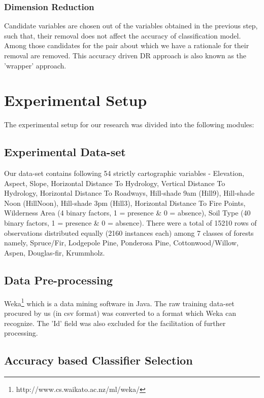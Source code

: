 \documentclass{llncs}
\begin{document}
\subsubsection{Dimension Reduction}

Candidate variables are chosen out of the variables obtained in the previous step, such that, their removal does not affect the accuracy of classification model. Among those candidates for the pair about which we have a rationale for their removal are removed. This accuracy driven DR approach is also known as the ’wrapper’ approach.


\section{Experimental Setup}

The experimental setup for our research was divided into the following modules:

\subsection{Experimental Data-set}

Our data-set contains following 54 strictly cartographic variables - Elevation, Aspect, Slope, Horizontal Distance To Hydrology, Vertical Distance To Hydrology, Horizontal Distance To Roadways, Hill-shade 9am (Hill9), Hill-shade Noon (HillNoon), Hill-shade 3pm (Hill3), Horizontal Distance To Fire Points, Wilderness Area (4 binary factors, 1 = presence \& 0 = absence), Soil Type (40 binary factors, 1 = presence \& 0 = absence). There were a total of 15210 rows of observations distributed equally (2160 instances each) among 7 classes of forests namely, Spruce/Fir, Lodgepole Pine, Ponderosa Pine, Cottonwood/Willow, Aspen, Douglas-fir, Krummholz.


\subsection{Data Pre-processing}

Weka\footnote{http://www.cs.waikato.ac.nz/ml/weka/} which is a data mining software in Java. The raw training data-set procured by us (in csv format) was converted to a format which Weka can recognize. The 'Id' field was also excluded for the facilitation of further processing.

\subsection{Accuracy based Classifier Selection}
\end{document}

